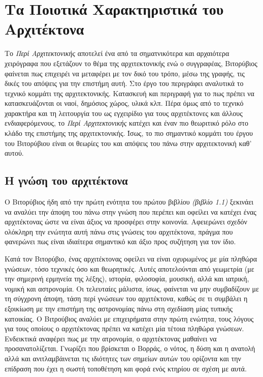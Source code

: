 \section{Τα Ποιοτικά Χαρακτηριστικά του Αρχιτέκτονα}

Το \emph{Περί Αρχιτεκτονικής} αποτελεί ένα από τα σηματνικότερα και αρχαιότερα χειρόγραφα που εξετάζουν το θέμα της αρχιτεκτονικής ενώ ο συγγραφέας, Βιτορύβιος φαίνεται πως επιχειρέι να μεταφέρει με τον δικό του τρόπο, μέσω της γραφής, τις δικές του απόψεις για την επιστήμη αυτή. Στο έργο του περιγράφει αναλυτικά το τεχνικό κομμάτι της αρχιτεκτονικής. Κατασκευή και περιγραφή για το πως πρέπει να κατασκευάζονται οι ναοί, δημόσιος χώρος, υλικά κλπ. Πέρα όμως από το τεχνικό χαρακτήρα και τη λειτουργία του ως εγχειρίδιο για τους αρχιτέκτονες και άλλους ενδιαφερόμενους, το \emph{Περί Αρχιτεκτονικής} κατέχει και έναν πιο θεωριτικό ρόλο στο κλάδο της επιστήμης της αρχιτεκτονικής. Ίσως, το πιο σημαντικό κομμάτι του έργου του Βιτορύβιου είναι οι θεωρίες του και απόψεις του πάνω στην αρχιτεκτονική καθ' αυτού. 

\subsection{Η γνώση του αρχιτέκτονα}

Ο Βιτορύβιος ήδη από την πρώτη ενότητα του πρώτου βιβλίου \emph{(βιβλίο 1.1)} ξεκινάει να αναλύει την άποψη του πάνω στην γνώση που περέπει και οφείλει να κατέχει ένας αρχιτέκτονας ώστε να είναι άξιος να προσφέρει στην κοινονία. Αφειερώνει σχεδόν ολόκληρη την ενώτητα αυτή πάνω στις γνώσεις του αρχιτέκτονα, πράγμα που φανερώνει πως είναι ιδιαίτερα σημαντικό και άξιο προς συζήτηση για τον ίδιο.

Κατά τον Βιτορύβιο, ένας αρχιτέκτονας οφείλει να είναι οχυρωμένος με μία πληθώρα γνώσεων, τόσο τεχνικές όσο και θεωρητικές. Αυτές αποτελούνται από γεωμετρία (με την σημερινή ερμηνεία της λέξης), ιστορία, φιλοσοφία, μουσική, αλλά και ιατρική, νομική και αστρονομία. \cite[σ. 392]{masterson_status_2004} Οι τελευταίες μάλιστα, ίσως, φαίνεται να μην συμβαδίζουν με τη σύγχρονη άποψη, τάση περί γνώσεων του αρχιτέκτονα, καθώς σε τι συμβάλει η εξοικίωση με την επιστήμη της αστρονομίας πάνω στη σχεδίαση μίας τυπικής κατοικίας. Ο Βιτρούβιος αναλύει με επιχειρήματα στην πρώτη ενώτητα, τους λόγους για τους οποίους ο αρχιτέκτονας πρέπει να κατέχει μία τέτοια πληθώρα γνώσεων. Ενδεικτικά αναφέρει πως με την ατρονομία, ο αρχιτέκτονας μαθαίνει να προσανατολίζεται. Γνωρίζει που βρίσκεται ο Βορράς, ο νότος, η δύση και η ανατολή αλλά και ανιτλαμβάινεται τις ιδιότητες των σημείων αυτών του ορίζοντα και την επίδραση που έχει η σωστή τοποθέτηση και φορά ενός κτηρίου σε σχέση με αυτά. \cite[σ. 43]{vitruvius-lefas}

